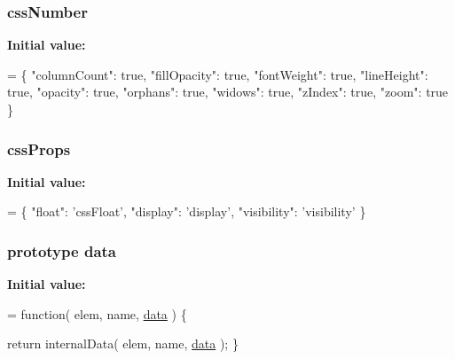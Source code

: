 \subsubsection[{css\+Number}]{ css\+Number}\label{jquery-1_810_82-vsdoc_8js_ac1d75df6fff702cd103f92cce26e1b29}
{\bfseries Initial value\+:}
\begin{DoxyCode}
= \{ \textcolor{stringliteral}{"columnCount"}: \textcolor{keyword}{true},
\textcolor{stringliteral}{"fillOpacity"}: \textcolor{keyword}{true},
\textcolor{stringliteral}{"fontWeight"}: \textcolor{keyword}{true},
\textcolor{stringliteral}{"lineHeight"}: \textcolor{keyword}{true},
\textcolor{stringliteral}{"opacity"}: \textcolor{keyword}{true},
\textcolor{stringliteral}{"orphans"}: \textcolor{keyword}{true},
\textcolor{stringliteral}{"widows"}: \textcolor{keyword}{true},
\textcolor{stringliteral}{"zIndex"}: \textcolor{keyword}{true},
\textcolor{stringliteral}{"zoom"}: \textcolor{keyword}{true} \}
\end{DoxyCode}
\hypertarget{jquery-1_810_82-vsdoc_8js_a5bc8f2d604bc8e8a89fe5eaf624364e1}{}
\subsubsection[{css\+Props}]{ css\+Props}\label{jquery-1_810_82-vsdoc_8js_a5bc8f2d604bc8e8a89fe5eaf624364e1}
{\bfseries Initial value\+:}
\begin{DoxyCode}
= \{ \textcolor{stringliteral}{"float"}: \textcolor{stringliteral}{'cssFloat'},
\textcolor{stringliteral}{"display"}: \textcolor{stringliteral}{'display'},
\textcolor{stringliteral}{"visibility"}: \textcolor{stringliteral}{'visibility'} \}
\end{DoxyCode}
\hypertarget{jquery-1_810_82-vsdoc_8js_a609407b3456fdc3c5671a9fc4a226ff7}{}
\subsubsection[{data}]{ {\bf prototype} data}\label{jquery-1_810_82-vsdoc_8js_a609407b3456fdc3c5671a9fc4a226ff7}
{\bfseries Initial value\+:}
\begin{DoxyCode}
= \textcolor{keyword}{function}( elem, name, \hyperlink{jquery-1_810_82-vsdoc_8js_a609407b3456fdc3c5671a9fc4a226ff7}{data} ) \{


        \textcolor{keywordflow}{return} internalData( elem, name, \hyperlink{jquery-1_810_82-vsdoc_8js_a609407b3456fdc3c5671a9fc4a226ff7}{data} );
    \}
\end{DoxyCode}
\hypertarget{jquery-1_810_82-vsdoc_8js_a94c0d6e51790b913f3bcdb696d3d2863}{}
